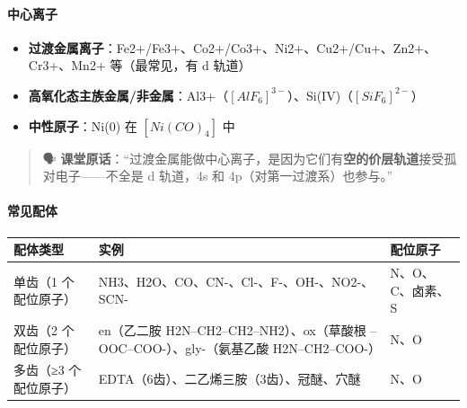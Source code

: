 \documentclass[a4paper,11pt]{ctexart}
\providecommand{\tightlist}{\setlength{\itemsep}{0pt}\setlength{\parskip}{0pt}}
\newcounter{none}
\begin{document}
\paragraph{中心离子}\label{ux4e2dux5fc3ux79bbux5b50}

\begin{itemize}
\tightlist
\item
  \textbf{过渡金属离子}：Fe2+/Fe3+、Co2+/Co3+、Ni2+、Cu2+/Cu+、Zn2+、Cr3+、Mn2+ 等（最常见，有 d 轨道）
\item
  \textbf{高氧化态主族金属/非金属}：Al3+（\([AlF_6]^{3-}\)）、Si(IV)（\([SiF_6]^{2-}\)）
\item
  \textbf{中性原子}：Ni(0) 在 \([Ni(CO)_4]\) 中
\end{itemize}

\begin{quote}
🗣️ \textbf{课堂原话}：``过渡金属能做中心离子，是因为它们有\textbf{空的价层轨道}接受孤对电子------不全是 d 轨道，4s 和 4p（对第一过渡系）也参与。''
\end{quote}

\paragraph{常见配体}\label{ux5e38ux89c1ux914dux4f53}

{\def\LTcaptype{none} %
\begin{longtable}[]{@{}
  >{\raggedright\arraybackslash}p{}
  >{\raggedright\arraybackslash}p{}
  >{\centering\arraybackslash}p{}@{}}
\toprule\noalign{}
\begin{minipage}[b]{\linewidth}\raggedright
配体类型
\end{minipage} & \begin{minipage}[b]{\linewidth}\raggedright
实例
\end{minipage} & \begin{minipage}[b]{\linewidth}\centering
配位原子
\end{minipage} \\
\midrule\noalign{}
\endhead
\bottomrule\noalign{}
\endlastfoot
单齿（1 个配位原子） & NH3、H2O、CO、CN-、Cl-、F-、OH-、NO2-、SCN- & N、O、C、卤素、S \\
双齿（2 个配位原子） & en（乙二胺 H2N--CH2--CH2--NH2）、ox（草酸根 --OOC--COO-）、gly-（氨基乙酸 H2N--CH2--COO-） & N、O \\
多齿（≥3 个配位原子） & EDTA（6齿）、二乙烯三胺（3齿）、冠醚、穴醚 & N、O \\
\end{longtable}
}
\end{document}
